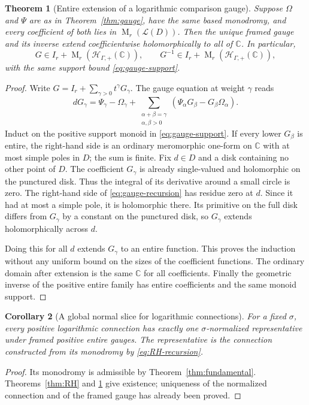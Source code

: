 \documentclass[11pt,letterpaper]{article}
\numberwithin{equation}{section}
\newtheorem{theorem}{Theorem}[section]
\newtheorem{corollary}[theorem]{Corollary}
\theoremstyle{definition}
\theoremstyle{remark}
\newcommand{\C}{\mathbb C}
\newcommand{\HH}{\mathcal H}
\newcommand{\LL}{\mathcal L}
\newcommand{\Mat}{\operatorname{M}}
\newcommand{\Hp}{\HH_{\Gamma,+}}
\begin{document}
\begin{theorem}[Entire extension of a logarithmic comparison gauge]
\label{thm:entire-gauge}
Suppose $\Omega$ and $\Psi$ are as in Theorem~\ref{thm:gauge}, have the same
based monodromy, and every coefficient of both lies in $\Mat_r(\LL(D))$.
Then the unique framed gauge and its inverse extend coefficientwise
holomorphically to all of $\C$. In particular,
\[
 G\in I_r+\Mat_r(\Hp(\C)),
 \qquad G^{-1}\in I_r+\Mat_r(\Hp(\C)),
\]
with the same support bound \eqref{eq:gauge-support}.
\end{theorem}
\begin{proof}
Write $G=I_r+\sum_{\gamma>0}t^\gamma G_\gamma$. The gauge equation at
weight $\gamma$ reads
\begin{equation}\label{eq:gauge-recursion}
 dG_\gamma=\Psi_\gamma-\Omega_\gamma+
 \sum_{\substack{\alpha+\beta=\gamma\\\alpha,\beta>0}}
       (\Psi_\alpha G_\beta-G_\beta\Omega_\alpha).
\end{equation}
Induct on the positive support monoid in \eqref{eq:gauge-support}. If every
lower $G_\beta$ is entire, the right-hand side is an ordinary meromorphic
one-form on $\C$ with at most simple poles in $D$; the sum is finite.
Fix $d\in D$ and a disk containing no other point of $D$. The coefficient
$G_\gamma$ is already single-valued and holomorphic on the punctured disk.
Thus the integral of its derivative around a small circle is zero.
The right-hand side of \eqref{eq:gauge-recursion} has residue zero at $d$.
Since it had at most a simple pole, it is holomorphic there. Its primitive
on the full disk differs from $G_\gamma$ by a constant on the punctured
disk, so $G_\gamma$ extends holomorphically across $d$.

Doing this for all $d$ extends $G_\gamma$ to an entire function. This proves
the induction without any uniform bound on the sizes of the coefficient
functions. The ordinary domain after extension is the same $\C$ for all
coefficients. Finally the geometric inverse of the positive entire family
has entire coefficients and the same monoid support.
\end{proof}

\begin{corollary}[A global normal slice for logarithmic connections]
For a fixed $\sigma$, every positive logarithmic connection has exactly one
$\sigma$-normalized representative under framed positive entire gauges.
The representative is the connection constructed from its monodromy by
\eqref{eq:RH-recursion}.
\end{corollary}
\begin{proof}
Its monodromy is admissible by Theorem~\ref{thm:fundamental}.
Theorems~\ref{thm:RH} and \ref{thm:entire-gauge} give existence; uniqueness
of the normalized connection and of the framed gauge has already been
proved.
\end{proof}
\end{document}
